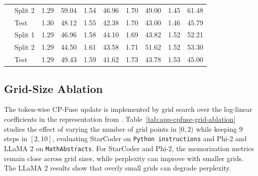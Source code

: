\begin{table}[!tbp]
\begin{adjustbox}{max width=\textwidth}
\begin{tabular}{ll|cc|cc|cc|cc}
& Split 2 & 1.29 & 59.04 & 1.54 & 46.96 & 1.70 & 49.00 & 1.45 & 61.48 \\
& Test    & 1.30 & 48.12 & 1.55 & 42.38 & 1.70 & 43.00 & 1.46 & 45.79 \\
\midrule
{}
& Split 1 & 1.29 & 46.96 & 1.58 & 44.10 & 1.69 & 43.82 & 1.52 & 52.21 \\
& Split 2 & 1.29 & 44.50 & 1.61 & 43.58 & 1.71 & 51.62 & 1.52 & 53.30 \\
& Test    & 1.29 & 49.43 & 1.59 & 41.62 & 1.73 & 43.78 & 1.53 & 45.00 \\
\bottomrule
\end{tabular}
\end{adjustbox}
\end{table}

\subsection{Grid-Size Ablation}

The token-wise CP-Fuse update is implemented by grid search over the log-linear coefficients in the representation from . Table~\ref{tab:app-cpfuse-grid-ablation} studies the effect of varying the number of grid points in \([0,2)\) while keeping \(9\) steps in \([2,10]\), evaluating StarCoder on \texttt{Python instructions} and Phi-2 and LLaMA 2 on \texttt{MathAbstracts}. For StarCoder and Phi-2, the memorization metrics remain close across grid sizes, while perplexity can improve with smaller grids. The LLaMA 2 results show that overly small grids can degrade perplexity.

